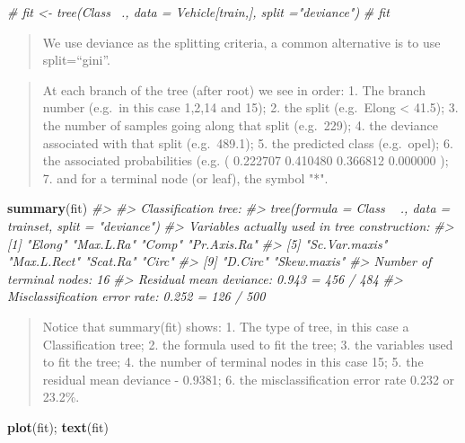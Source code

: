\documentclass[]{book}
\newenvironment{Shaded}{\begin{snugshade}}{\end{snugshade}}
\newcommand{\CommentTok}[1]{\textcolor[rgb]{0.56,0.35,0.01}{\textit{#1}}}
\newcommand{\KeywordTok}[1]{\textcolor[rgb]{0.13,0.29,0.53}{\textbf{#1}}}
\newcommand{\NormalTok}[1]{#1}
\begin{document}
\begin{Shaded}
\begin{Highlighting}[]
\CommentTok{# fit <- tree(Class ~., data = Vehicle[train,], split ="deviance")}
\CommentTok{# fit}
\end{Highlighting}
\end{Shaded}

\begin{quote}
We use deviance as the splitting criteria, a common alternative is to use
split=``gini''.
\end{quote}

\begin{quote}
At each branch of the tree (after root) we see in order:
1. The branch number (e.g.~in this case 1,2,14 and 15);
2. the split (e.g.~Elong \textless{} 41.5);
3. the number of samples going along that split (e.g.~229);
4. the deviance associated with that split (e.g.~489.1);
5. the predicted class (e.g.~opel);
6. the associated probabilities (e.g. ( 0.222707 0.410480 0.366812 0.000000
);
7. and for a terminal node (or leaf), the symbol "*".
\end{quote}

\begin{Shaded}
\begin{Highlighting}[]
\KeywordTok{summary}\NormalTok{(fit)}
\CommentTok{#> }
\CommentTok{#> Classification tree:}
\CommentTok{#> tree(formula = Class ~ ., data = trainset, split = "deviance")}
\CommentTok{#> Variables actually used in tree construction:}
\CommentTok{#>  [1] "Elong"        "Max.L.Ra"     "Comp"         "Pr.Axis.Ra"  }
\CommentTok{#>  [5] "Sc.Var.maxis" "Max.L.Rect"   "Scat.Ra"      "Circ"        }
\CommentTok{#>  [9] "D.Circ"       "Skew.maxis"  }
\CommentTok{#> Number of terminal nodes:  16 }
\CommentTok{#> Residual mean deviance:  0.943 = 456 / 484 }
\CommentTok{#> Misclassification error rate: 0.252 = 126 / 500}
\end{Highlighting}
\end{Shaded}

\begin{quote}
Notice that summary(fit) shows:
1. The type of tree, in this case a Classification tree;
2. the formula used to fit the tree;
3. the variables used to fit the tree;
4. the number of terminal nodes in this case 15;
5. the residual mean deviance - 0.9381;
6. the misclassification error rate 0.232 or 23.2\%.
\end{quote}

\begin{Shaded}
\begin{Highlighting}[]
\KeywordTok{plot}\NormalTok{(fit); }\KeywordTok{text}\NormalTok{(fit)}
\end{Highlighting}
\end{Shaded}
\end{document}

